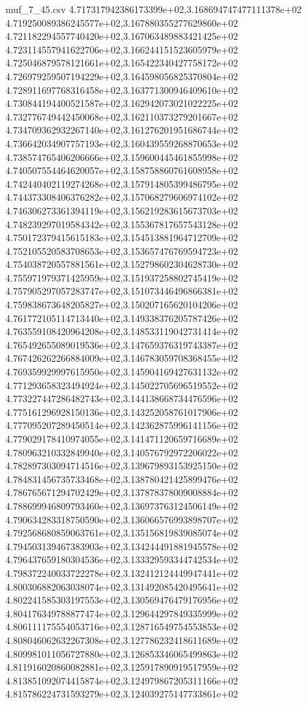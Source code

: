 \begin{filecontents*}{muf_7_45.csv}
4.717317942386173399e+02,3.168694747477111378e+02
4.719250089386245577e+02,3.167880355277629860e+02
4.721182294557740420e+02,3.167063489883421425e+02
4.723114557941622706e+02,3.166244151523605979e+02
4.725046879578121661e+02,3.165422340427758172e+02
4.726979259507194229e+02,3.164598056825370804e+02
4.728911697768316458e+02,3.163771300946409610e+02
4.730844194400521587e+02,3.162942073021022225e+02
4.732776749442450068e+02,3.162110373279201667e+02
4.734709362932267140e+02,3.161276201951686744e+02
4.736642034907757193e+02,3.160439559268870653e+02
4.738574765406206666e+02,3.159600445461855998e+02
4.740507554464620057e+02,3.158758860761608958e+02
4.742440402119274268e+02,3.157914805399486795e+02
4.744373308406376282e+02,3.157068279606974102e+02
4.746306273361394119e+02,3.156219283615673703e+02
4.748239297019584342e+02,3.155367817657543128e+02
4.750172379415615183e+02,3.154513881964712709e+02
4.752105520583708653e+02,3.153657476769594723e+02
4.754038720557881561e+02,3.152798602304628730e+02
4.755971979371425959e+02,3.151937258802745419e+02
4.757905297057283747e+02,3.151073446496866381e+02
4.759838673648205827e+02,3.150207165620104206e+02
4.761772105114713440e+02,3.149338376205787426e+02
4.763559108420964208e+02,3.148533119042731414e+02
4.765492655089019536e+02,3.147659376319743387e+02
4.767426262266884009e+02,3.146783059708368455e+02
4.769359929997615950e+02,3.145904169427631132e+02
4.771293658323494924e+02,3.145022705696519552e+02
4.773227447286482743e+02,3.144138668734476596e+02
4.775161296928150136e+02,3.143252058761017906e+02
4.777095207289450514e+02,3.142362875996141156e+02
4.779029178410974055e+02,3.141471120659716689e+02
4.780963210332849940e+02,3.140576792972206022e+02
4.782897303094714516e+02,3.139679893153925150e+02
4.784831456735733468e+02,3.138780421425899476e+02
4.786765671294702429e+02,3.137878378009008884e+02
4.788699946809793460e+02,3.136973763124506149e+02
4.790634283318750590e+02,3.136066576993898707e+02
4.792568680859063761e+02,3.135156819839085074e+02
4.794503139467383903e+02,3.134244491881945578e+02
4.796437659180304536e+02,3.133329593344742534e+02
4.798372240033722278e+02,3.132412124449947441e+02
4.800306882063038074e+02,3.131492085420495641e+02
4.802241585303197553e+02,3.130569476479176956e+02
4.804176349788877474e+02,3.129644297849335999e+02
4.806111175554053716e+02,3.128716549754553853e+02
4.808046062632267308e+02,3.127786232418611689e+02
4.809981011056727880e+02,3.126853346065499863e+02
4.811916020860082881e+02,3.125917890919517959e+02
4.813851092074415874e+02,3.124979867205311166e+02
4.815786224731593279e+02,3.124039275147733861e+02

\end{filecontents*}
